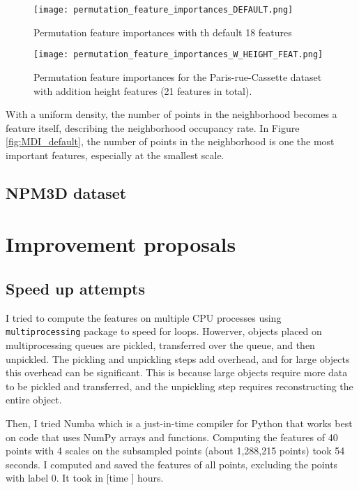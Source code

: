 \documentclass{article}
\begin{document}
\begin{figure}
    \hspace*{-2cm}
    \texttt{[image: permutation\_feature\_importances\_DEFAULT.png]}
    \caption{Permutation feature importances with th default 18 features}
    \label{fig:permutation_default}
\end{figure}
\begin{figure}
    \hspace*{-2cm}
        \texttt{[image: permutation\_feature\_importances\_W\_HEIGHT\_FEAT.png]}
    \caption{Permutation feature importances for the Paris-rue-Cassette dataset with addition height features (21 features in total).}
    \label{fig:permutation_height}
\end{figure}

With a uniform density, the number of points in the neighborhood becomes a feature itself, describing the neighborhood occupancy rate. In Figure \ref{fig:MDI_default}, the number of points in the neighborhood is one the most important features, especially at the smallest scale. 

\subsection{NPM3D dataset}


\section{Improvement proposals}
\subsection{Speed up attempts}
I tried to compute the features on multiple CPU processes using \texttt{multiprocessing} package to speed for loops. Howerver, objects placed on multiprocessing queues are pickled, transferred over the queue, and then unpickled. The pickling and unpickling steps add overhead, and for large objects this overhead can be significant. This is because large objects require more data to be pickled and transferred, and the unpickling step requires reconstructing the entire object. 

Then, I tried Numba which is a just-in-time compiler for Python that works best on code that uses NumPy arrays and functions. Computing the features of 40 points with 4 scales on the subsampled points (about 1,288,215 points) took 54 seconds. I computed and saved the features of all points, excluding the points with label 0. It took in [time ] hours. 
\end{document}
